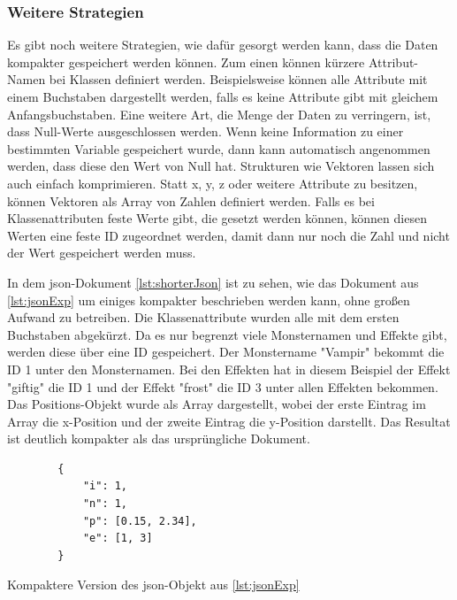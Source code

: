 \subsubsection{Weitere Strategien}
Es gibt noch weitere Strategien, wie dafür gesorgt werden kann, dass die Daten kompakter gespeichert werden können. Zum einen können kürzere Attribut-Namen bei Klassen definiert werden. Beispielsweise können alle Attribute mit einem Buchstaben dargestellt werden, falls es keine Attribute gibt mit gleichem Anfangsbuchstaben. Eine weitere Art, die Menge der Daten zu verringern, ist, dass Null-Werte ausgeschlossen werden. Wenn keine Information zu einer bestimmten Variable gespeichert wurde, dann kann automatisch angenommen werden, dass diese den Wert von Null hat. Strukturen wie Vektoren lassen sich auch einfach komprimieren. Statt x, y, z oder weitere Attribute zu besitzen, können Vektoren als Array von Zahlen definiert werden. Falls es bei Klassenattributen feste Werte gibt, die gesetzt werden können, können diesen Werten eine feste ID zugeordnet werden, damit dann nur noch die Zahl und nicht der Wert gespeichert werden muss.\cite{objelean2011json}\cite{baeldungReducingJSON}

In dem \ac{json}-Dokument \ref{lst:shorterJson} ist zu sehen, wie das Dokument aus \ref{lst:jsonExp} um einiges kompakter beschrieben werden kann, ohne großen Aufwand zu betreiben. Die Klassenattribute wurden alle mit dem ersten Buchstaben abgekürzt. Da es nur begrenzt viele Monsternamen und Effekte gibt, werden diese über eine ID gespeichert. Der Monstername "Vampir" bekommt die ID 1 unter den Monsternamen. Bei den Effekten hat in diesem Beispiel der Effekt "giftig" die ID 1 und der Effekt "frost" die ID 3 unter allen Effekten bekommen. Das Positions-Objekt wurde als Array dargestellt, wobei der erste Eintrag im Array die x-Position und der zweite Eintrag die y-Position darstellt. Das Resultat ist deutlich kompakter als das ursprüngliche Dokument.

\begin{listing}[htp]
    \begin{verbatim}
        {
            "i": 1,
            "n": 1,
            "p": [0.15, 2.34],
            "e": [1, 3]
        }
    \end{verbatim}
    \caption{Kompaktere Version des \ac{json}-Objekt aus \ref{lst:jsonExp}}
    \label{lst:shorterJson}
\end{listing}




